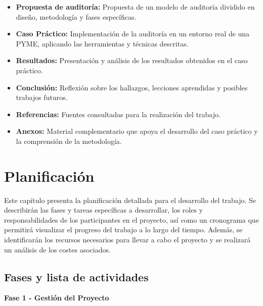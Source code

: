 \documentclass[a4paper, 11pt]{article}
\begin{document}
\begin{itemize}
    \item \textbf{Propuesta de auditoría:} Propuesta de un modelo de auditoría dividido en diseño, metodología y fases específicas.
    
    \item \textbf{Caso Práctico:} Implementación de la auditoría en un entorno real de una PYME, aplicando las herramientas y técnicas descritas.
    
    \item \textbf{Resultados:} Presentación y análisis de los resultados obtenidos en el caso práctico.
    
    \item \textbf{Conclusión:} Reflexión sobre los hallazgos, lecciones aprendidas y posibles trabajos futuros.
    
    \item \textbf{Referencias:} Fuentes consultadas para la realización del trabajo.
    
    \item \textbf{Anexos:}  Material complementario que apoya el desarrollo del caso práctico y la comprensión de la metodología.

\end{itemize}




\clearpage

\section{Planificación}
\par\vspace{0.5cm}
Este capítulo presenta la planificación detallada para el desarrollo del trabajo. Se describirán las fases y tareas específicas a desarrollar, los roles y responsabilidades de los participantes en el proyecto, así como un cronograma que permitirá visualizar el progreso del trabajo a lo largo del tiempo. Además, se identificarán los recursos necesarios para llevar a cabo el proyecto y se realizará un análisis de los costes asociados.
\par\vspace{0.5cm}

\subsection{Fases y lista de actividades}
\par\vspace{0.5cm}
\textbf{\large Fase 1 - Gestión del Proyecto} \vspace{0.5cm}
\end{document}
